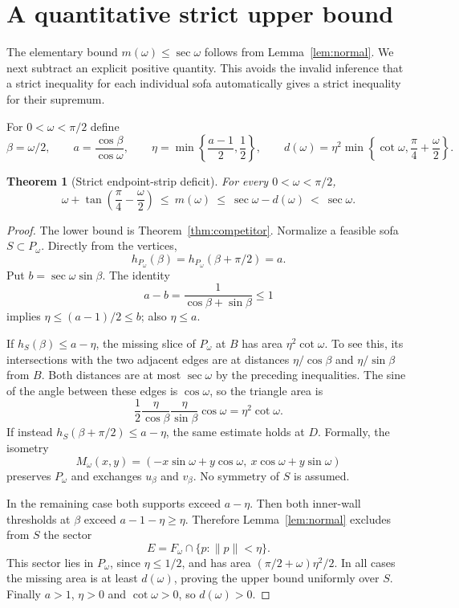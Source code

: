\documentclass[11pt]{article}
\newtheorem{theorem}{Theorem}[section]
\theoremstyle{remark}\newtheorem{remark}[theorem]{Remark}
\begin{document}
\section{A quantitative strict upper bound}
The elementary bound $m(\omega)\le\sec\omega$ follows from Lemma~\ref{lem:normal}. We next subtract an explicit positive quantity. This avoids the invalid inference that a strict inequality for each individual sofa automatically gives a strict inequality for their supremum.

For $0<\omega<\pi/2$ define
\[
 \beta=\omega/2,\qquad a=\frac{\cos\beta}{\cos\omega},\qquad
 \eta=\min\left\{\frac{a-1}{2},\frac12\right\},\qquad
 d(\omega)=\eta^2\min\left\{\cot\omega,\frac\pi4+\frac\omega2\right\}.
\]
\begin{theorem}[Strict endpoint-strip deficit]\label{thm:strict}
For every $0<\omega<\pi/2$,
\[
 \omega+\tan\left(\frac\pi4-\frac\omega2\right)
 \ \le\ m(\omega)\ \le\ \sec\omega-d(\omega)\ <\ \sec\omega.
\]
\end{theorem}
\begin{proof}
The lower bound is Theorem~\ref{thm:competitor}. Normalize a feasible sofa $S\subset P_\omega$. Directly from the vertices,
\[
 h_{P_\omega}(\beta)=h_{P_\omega}(\beta+\pi/2)=a.
\]
Put $b=\sec\omega\sin\beta$. The identity
\[
 a-b=\frac1{\cos\beta+\sin\beta}\le1
\]
implies $\eta\le(a-1)/2\le b$; also $\eta\le a$.

If $h_S(\beta)\le a-\eta$, the missing slice of $P_\omega$ at $B$ has area $\eta^2\cot\omega$. To see this, its intersections with the two adjacent edges are at distances $\eta/\cos\beta$ and $\eta/\sin\beta$ from $B$. Both distances are at most $\sec\omega$ by the preceding inequalities. The sine of the angle between these edges is $\cos\omega$, so the triangle area is
\[
 \frac12\frac{\eta}{\cos\beta}\frac{\eta}{\sin\beta}\cos\omega=\eta^2\cot\omega.
\]
If instead $h_S(\beta+\pi/2)\le a-\eta$, the same estimate holds at $D$. Formally, the isometry
\[
 M_\omega(x,y)=(-x\sin\omega+y\cos\omega,\ x\cos\omega+y\sin\omega)
\]
preserves $P_\omega$ and exchanges $u_\beta$ and $v_\beta$. No symmetry of $S$ is assumed.

In the remaining case both supports exceed $a-\eta$. Then both inner-wall thresholds at $\beta$ exceed $a-1-\eta\ge\eta$. Therefore Lemma~\ref{lem:normal} excludes from $S$ the sector
\[
 E=F_\omega\cap\{p:\lVert p\rVert<\eta\}.
\]
This sector lies in $P_\omega$, since $\eta\le1/2$, and has area $(\pi/2+\omega)\eta^2/2$. In all cases the missing area is at least $d(\omega)$, proving the upper bound uniformly over $S$. Finally $a>1$, $\eta>0$ and $\cot\omega>0$, so $d(\omega)>0$.
\end{proof}
\end{document}
